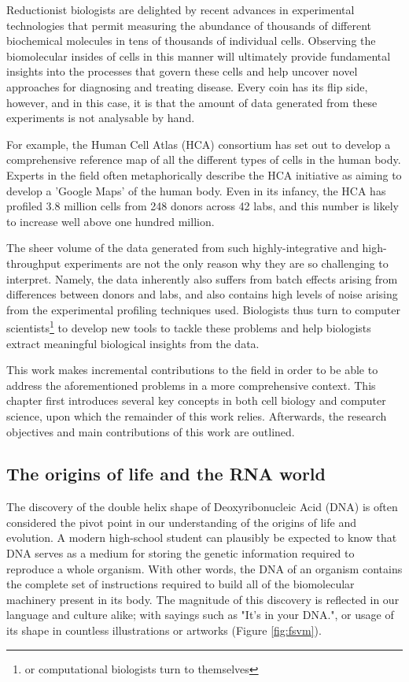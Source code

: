 Reductionist biologists are delighted by recent advances in experimental technologies that permit measuring the abundance of thousands of different biochemical molecules in tens of thousands of individual cells.  Observing the biomolecular insides of cells in this manner will ultimately provide fundamental insights into the processes that govern these cells and help uncover novel approaches for diagnosing and treating disease. Every coin has its flip side, however, and in this case, it is that the amount of data generated from these experiments is not analysable by hand.  

For example, the Human Cell Atlas (HCA) consortium\cite{regev_humancellatlas_2018} has set out to develop a comprehensive reference map of all the different types of cells in the human body. Experts in the field often metaphorically describe the HCA initiative as aiming to develop a 'Google Maps' of the human body. Even in its infancy, the HCA has profiled 3.8 million cells from 248 donors across 42 labs\cite{humancellatlasconsortium_humancellatlas_2018}, and this number is likely to increase well above one hundred million.

The sheer volume of the data generated from such highly-integrative and high-throughput experiments are not the only reason why they are so challenging to interpret. Namely, the data inherently also suffers from batch effects arising from differences between donors and labs, and also contains high levels of noise arising from the experimental profiling techniques used\cite{hon_humancellatlas_2018}. Biologists thus turn to computer scientists\footnote{or computational biologists turn to themselves} to develop new tools to tackle these problems and help biologists extract meaningful biological insights from the data.

This work makes incremental contributions to the field in order to be able to address the aforementioned problems in a more comprehensive context. This chapter first introduces several key concepts in both cell biology and computer science, upon which the remainder of this work relies. Afterwards, the research objectives and main contributions of this work are outlined.
\subsection{The origins of life and the RNA world}
The discovery of the double helix shape of Deoxyribonucleic Acid (DNA) \cite{watson_molecularstructurenucleic_1953} is often considered the pivot point in our understanding of the origins of life and evolution. A modern high-school student can plausibly be expected to know that DNA serves as a medium for storing the genetic information required to reproduce a whole organism. With other words, the DNA of an organism contains the complete set of instructions required to build all of the biomolecular machinery present in its body. The magnitude of this discovery is reflected in our language and culture alike; with sayings such as "It's in your DNA.", or usage of its shape in countless illustrations or artworks (Figure \ref{fig:fsvm}).

